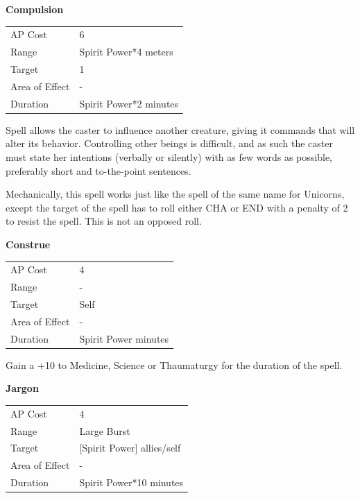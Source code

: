 \documentclass[11pt,a4paper,twocolumn]{book}
\begin{document}
\smallskip
\noindent
\textbf{Compulsion}

\smallskip
{
	\begin{tabu} to 70mm{| X[l,4] | X[l,7] |}
		\hline
        AP Cost	      	& 6 						\\
        Range     		& Spirit Power*4 meters				\\
        Target      	& 1		\\
        Area of Effect  & -  	 			\\
        Duration     	& Spirit Power*2 minutes		\\ \hline
	\end{tabu}
		
}
\smallskip

Spell allows the caster to influence another creature, giving it commands that will alter its behavior. Controlling other beings is difficult, and as such the caster must state her intentions (verbally or silently) with as few words as possible, preferably short and to-the-point sentences. 

Mechanically, this spell works just like the spell of the same name for Unicorns, except the target of the spell has to roll either CHA or END with a penalty of 2 to resist the spell. This is not an opposed roll.


\bigskip
\noindent
\textbf{Construe}

\smallskip
{
	\begin{tabu} to 70mm{| X[l,4] | X[l,7] |}
		\hline
        AP Cost	      	& 4 						\\
        Range     		& -				\\
        Target      	& Self		\\
        Area of Effect  & -  	 			\\
        Duration     	& Spirit Power minutes		\\ \hline
	\end{tabu}
		
}
\smallskip

Gain a +10 to Medicine, Science or Thaumaturgy for the duration of the spell.

\bigskip
\noindent
\textbf{Jargon}

\smallskip
{
	\begin{tabu} to 70mm{| X[l,4] | X[l,7] |}
		\hline
        AP Cost	      	& 4 						\\
        Range     		& Large Burst				\\
        Target      	& [Spirit Power] allies/self		\\
        Area of Effect  & -  	 			\\
        Duration     	& Spirit Power*10 minutes		\\ \hline
	\end{tabu}
		
}
\smallskip
\end{document}
